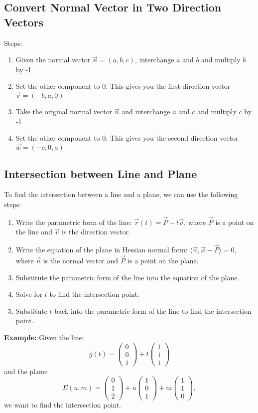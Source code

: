 \subsection{Convert Normal Vector in Two Direction Vectors}
Steps:
\begin{enumerate}[label=(\roman*)]
	\item Given the normal vector $\vec{n} = (a, b, c)$, interchange $a$ and $b$ and multiply $b$ by -1
	\item Set the other component to 0. This gives you the first direction vector $\vec{v} = (-b, a, 0)$
	\item Take the original normal vector $\vec{n}$ and interchange $a$ and $c$ and multiply $c$ by -1
	\item Set the other component to 0. This gives you the second direction vector $\vec{w} = (-c, 0, a)$
\end{enumerate}

\subsection{Intersection between Line and Plane}
To find the intersection between a line and a plane, we can use the following steps:
\begin{enumerate}[label=(\roman*)]
	\item Write the parametric form of the line: $\vec{r}(t) = \vec{P} + t\vec{v}$, where $\vec{P}$ is a point on the line and $\vec{v}$ is the direction vector.
	\item Write the equation of the plane in Hessian normal form: $\langle \vec{n}, \vec{x} - \vec{P} \rangle = 0$, where $\vec{n}$ is the normal vector and $\vec{P}$ is a point on the plane.
	\item Substitute the parametric form of the line into the equation of the plane.
	\item Solve for $t$ to find the intersection point.
	\item Substitute $t$ back into the parametric form of the line to find the intersection point.
\end{enumerate}
\textbf{Example:}
Given the line:
\[
	g(t) = \begin{pmatrix} 0 \\ 0 \\ 1 \end{pmatrix} + t \begin{pmatrix} 1 \\ 1 \\ 1 \end{pmatrix}
\]
and the plane:
\[
	E(u, m) = \begin{pmatrix} 0 \\ 1 \\ 2 \end{pmatrix} + u \begin{pmatrix} 1 \\ 0 \\ 1 \end{pmatrix} + m \begin{pmatrix} 1 \\ 1 \\ 0 \end{pmatrix},
\]
we want to find the intersection point.

